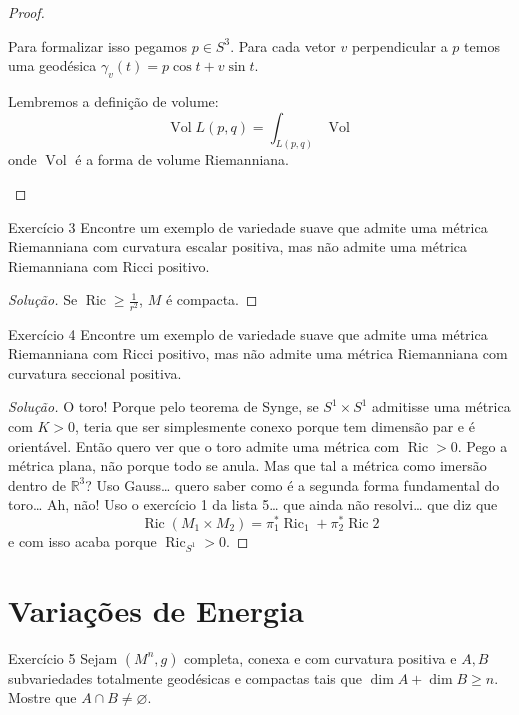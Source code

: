 \begin{proof}
\begin{enumerate}[label=(\alph*)]
	Para formalizar isso pegamos \(p \in S^3\). Para cada vetor \(v\) perpendicular a \(p\) temos uma geodésica \(\gamma_v(t)=p\cos t+v\sin t\).

Lembremos a definição de volume:
	\[\operatorname{Vol}L(p,q)=\int_{L(p,q)}\operatorname{Vol}\]
onde \(\operatorname{Vol}\) é a forma de volume Riemanniana.	
\end{enumerate}
\end{proof}

\begin{thing6}{Exercício 3}\label{exer:3}\leavevmode
Encontre um exemplo de variedade suave que admite uma métrica Riemanniana com curvatura escalar positiva, mas não admite uma métrica Riemanniana com Ricci positivo.
\end{thing6}

\begin{proof}[Solução]\leavevmode
Se \(\operatorname{Ric} \geq \frac{1}{r^2}\), \(M\) é compacta.
\end{proof}

\begin{thing6}{Exercício 4}\label{exer:4}\leavevmode
Encontre um exemplo de variedade suave que admite uma métrica Riemanniana com Ricci positivo, mas não admite uma métrica Riemanniana com curvatura seccional positiva.
\end{thing6}

\begin{proof}[Solução]\leavevmode
O toro! Porque pelo teorema de Synge, se \(S^1\times S^1\) admitisse uma métrica com \(K>0\), teria que ser simplesmente conexo porque tem dimensão par e é orientável. Então quero ver que o toro admite uma métrica com \(\operatorname{Ric}>0\). Pego a métrica plana, não porque todo se anula. Mas que tal a métrica como imersão dentro de \(\mathbb{R}^3\)? Uso Gauss… quero saber como é a segunda forma fundamental do toro… Ah, não! Uso o exercício 1 da lista 5… que ainda não resolvi… que diz que
\[\operatorname{Ric}(M_1 \times M_2)=\pi_1^*\operatorname{Ric}_1 + \pi_2^*\operatorname{Ric}2\]
e com isso acaba porque \(\operatorname{Ric}_{S^1}>0\).
\end{proof}

\section{Variações de Energia}

\begin{thing6}{Exercício 5}\label{exer:5}\leavevmode
Sejam \((M^n,g)\) completa, conexa e com curvatura positiva e \(A,B\) subvariedades totalmente geodésicas e compactas tais que \(\dim A + \dim B \geq  n\). Mostre que \(A \cap B \neq  \varnothing\).
\end{thing6}

